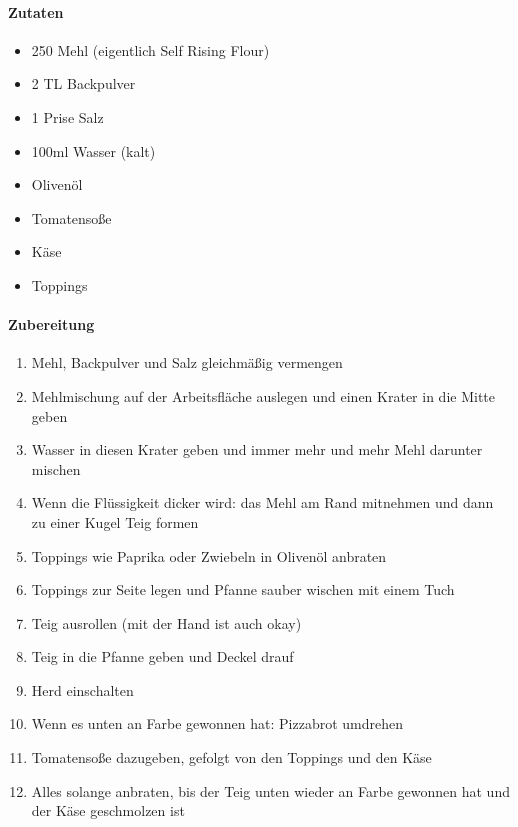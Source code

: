 \newpage
{}
\paragraph{Zutaten}
\begin{itemize}[noitemsep]
    \item 250 Mehl (eigentlich Self Rising Flour)
    \item 2 TL Backpulver 
    \item 1 Prise Salz
    \item 100ml Wasser (kalt)
    \item Olivenöl
    \item Tomatensoße
    \item Käse
    \item Toppings
\end{itemize}
\paragraph{Zubereitung}
\begin{enumerate}[noitemsep]
    \item Mehl, Backpulver und Salz gleichmäßig vermengen
    \item Mehlmischung auf der Arbeitsfläche auslegen und einen Krater in die Mitte geben
    \item Wasser in diesen Krater geben und immer mehr und mehr Mehl darunter mischen 
    \item Wenn die Flüssigkeit dicker wird: das Mehl am Rand mitnehmen und dann zu einer Kugel Teig formen
    \item Toppings wie Paprika oder Zwiebeln in Olivenöl anbraten
    \item Toppings zur Seite legen und Pfanne sauber wischen mit einem Tuch
    \item Teig ausrollen (mit der Hand ist auch okay)
    \item Teig in die Pfanne geben und Deckel drauf
    \item Herd einschalten
    \item Wenn es unten an Farbe gewonnen hat: Pizzabrot umdrehen
    \item Tomatensoße dazugeben, gefolgt von den Toppings und den Käse
    \item Alles solange anbraten, bis der Teig unten wieder an Farbe gewonnen hat und der Käse geschmolzen ist
\end{enumerate}